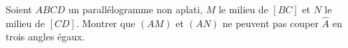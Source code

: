Soient $ABCD$ un parallélogramme non aplati, $M$ le milieu de $[BC]$ et $N$ le milieu de $[CD]$. Montrer que $(AM)$ et $(AN)$ ne peuvent pas couper $\hat{A}$ en trois angles égaux.
